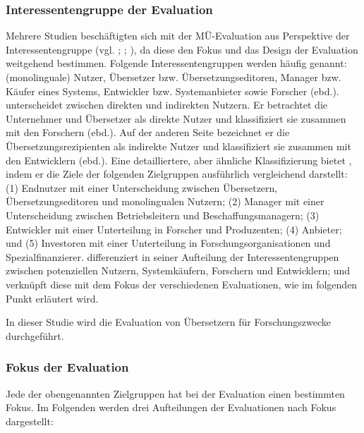 \subsubsection{Interessentengruppe der Evaluation}

Mehrere Studien beschäftigten sich mit der MÜ-Evaluation aus Perspektive der Interessentengruppe (vgl. \citealt{Hutchins1997}; \citealt{Weber1998}; \citealt{White2003}), da diese den Fokus und das Design der Evaluation weitgehend bestimmen. Folgende Interessentengruppen werden häufig genannt: (monolinguale) Nutzer, Übersetzer bzw. Übersetzungseditoren, Manager bzw. Käufer eines Systems, Entwickler bzw. Systemanbieter sowie Forscher (ebd.). \citet[65]{Weber1998} unterscheidet zwischen direkten und indirekten Nutzern. Er betrachtet die Unternehmer und Übersetzer als direkte Nutzer und klassifiziert sie zusammen mit den Forschern (ebd.). Auf der anderen Seite bezeichnet er die Übersetzungsrezipienten als indirekte Nutzer und klassifiziert sie zusammen mit den Entwicklern (ebd.). Eine detailliertere, aber ähnliche Klassifizierung bietet \citet[209ff.]{White2003}, indem er die Ziele der folgenden Zielgruppen ausführlich vergleichend darstellt: (1) Endnutzer mit einer Unterscheidung zwischen Übersetzern, Übersetzungseditoren und monolingualen Nutzern; (2) Manager mit einer Unterscheidung zwischen Betriebsleitern und Beschaffungsmanagern; (3) Entwickler mit einer Unterteilung in Forscher und Produzenten; (4) Anbieter; und (5) Investoren mit einer Unterteilung in Forschungsorganisationen und Spezialfinanzierer. \citet[418]{Hutchins1997} differenziert in seiner Aufteilung der Interessentengruppen zwischen potenziellen Nutzern, Systemkäufern, Forschern und Entwicklern; und verknüpft diese mit dem Fokus der verschiedenen Evaluationen, wie im folgenden Punkt erläutert wird.

In dieser Studie wird die Evaluation von Übersetzern für Forschungszwecke durchgeführt.

\subsubsection{Fokus der Evaluation}

Jede der obengenannten Zielgruppen hat bei der Evaluation einen bestimmten Fokus. Im Folgenden werden drei Aufteilungen der Evaluationen nach Fokus dargestellt:


